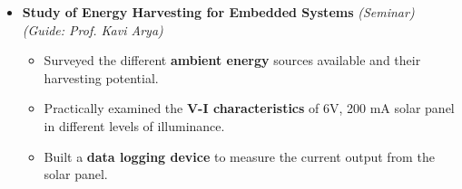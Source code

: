 \documentclass{article}
\begin{document}
\vspace{-4mm}
\begin{itemize}[leftmargin=3.5mm]
	\setlength{\itemsep}{-0.29em}
	\item \textbf{Study of Energy Harvesting for Embedded Systems} \textit{(Seminar)}\hfill{}
	\\\textit{(Guide: Prof. Kavi Arya)}
	\vspace{-6pt}
	\begin{itemize}[leftmargin=3.5mm]
		\vspace{-0.25mm}
		\setlength{\itemsep}{0.4mm}
		\item Surveyed the different \textbf{ambient energy} sources available and their harvesting potential.
		\vspace{-0.5mm}
		\item Practically examined the \textbf{V-I characteristics} of 6V, 200 mA solar panel in different levels of illuminance. 
		\vspace{-0.5mm}
		\item Built a \textbf{data logging device} to measure the current output from the solar panel. 
	\end{itemize}
\end{itemize}

\vspace{-1mm}\underline{}
\end{document}

